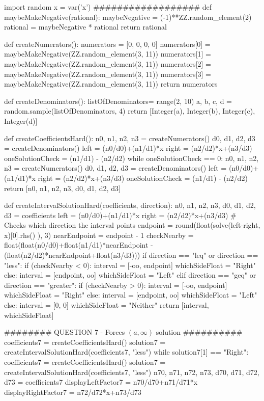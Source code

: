 \documentclass{ximera}
\begin{document}
\begin{sagesilent}
import random
x = var('x')
##################
def maybeMakeNegative(rational):
    maybeNegative = (-1)**ZZ.random_element(2)
    rational = maybeNegative * rational
    return rational
    
def createNumerators():
    numerators = [0, 0, 0, 0]
    numerators[0] = maybeMakeNegative(ZZ.random_element(3, 11))
    numerators[1] = maybeMakeNegative(ZZ.random_element(3, 11))
    numerators[2] = maybeMakeNegative(ZZ.random_element(3, 11))
    numerators[3] = maybeMakeNegative(ZZ.random_element(3, 11))
    return numerators

def createDenominators():
    listOfDenominators= range(2, 10)
    a, b, c, d = random.sample(listOfDenominators, 4)
    return [Integer(a), Integer(b), Integer(c), Integer(d)]

def createCoefficientsHard():
    n0, n1, n2, n3 = createNumerators()
    d0, d1, d2, d3 = createDenominators()
    left = (n0/d0)+(n1/d1)*x
    right = (n2/d2)*x+(n3/d3)
    oneSolutionCheck = (n1/d1) - (n2/d2)
    while oneSolutionCheck == 0:
        n0, n1, n2, n3 = createNumerators()
        d0, d1, d2, d3 = createDenominators()
        left = (n0/d0)+(n1/d1)*x
        right = (n2/d2)*x+(n3/d3)
        oneSolutionCheck = (n1/d1) - (n2/d2)
    return [n0, n1, n2, n3, d0, d1, d2, d3]

def createIntervalSolutionHard(coefficients, direction):
    n0, n1, n2, n3, d0, d1, d2, d3 = coefficients
    left = (n0/d0)+(n1/d1)*x
    right = (n2/d2)*x+(n3/d3)
    # Checks which direction the interval points
    endpoint = round(float(solve(left-right, x)[0].rhs() ), 3)
    nearEndpoint = endpoint - 1
    checkNearby = float(float(n0/d0)+float(n1/d1)*nearEndpoint - (float(n2/d2)*nearEndpoint+float(n3/d3)))
    if direction == "leq" or direction == "less":
        if (checkNearby < 0):
            interval = [-oo, endpoint]
            whichSideFloat = "Right"
        else:
            interval = [endpoint, oo]
            whichSideFloat = "Left"  
    elif direction == "geq" or direction == "greater": 
        if (checkNearby > 0):
            interval = [-oo, endpoint]
            whichSideFloat = "Right"
        else:
            interval = [endpoint, oo]
            whichSideFloat = "Left"
    else:
        interval = [0, 0]
        whichSideFloat = "Neither"
    return [interval, whichSideFloat]

######## QUESTION 7 - Forces $(a, \infty)$ solution ##########
coefficients7 = createCoefficientsHard()
solution7 = createIntervalSolutionHard(coefficients7, "less")
while solution7[1] == "Right":
    coefficients7 = createCoefficientsHard()
    solution7 = createIntervalSolutionHard(coefficients7, "less")
n70, n71, n72, n73, d70, d71, d72, d73 = coefficients7
displayLeftFactor7 = n70/d70+n71/d71*x
displayRightFactor7 = n72/d72*x+n73/d73


\end{sagesilent}
\end{document}
